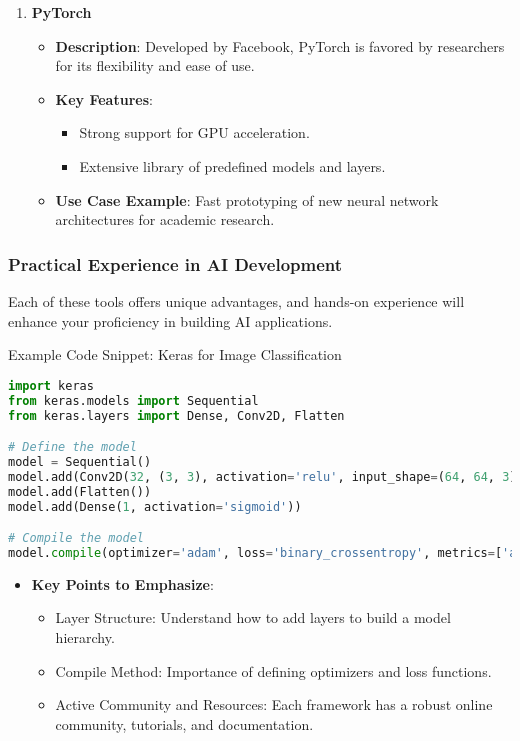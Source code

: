 \documentclass{beamer}
\begin{document}
\begin{frame}[fragile]
\begin{enumerate}
        \item \textbf{PyTorch}
            \begin{itemize}
                \item \textbf{Description}: Developed by Facebook, PyTorch is favored by researchers for its flexibility and ease of use.
                \item \textbf{Key Features}:
                    \begin{itemize}
                        \item Strong support for GPU acceleration.
                        \item Extensive library of predefined models and layers.
                    \end{itemize}
                \item \textbf{Use Case Example}: Fast prototyping of new neural network architectures for academic research.
            \end{itemize}
    \end{enumerate}
\end{frame}

\begin{frame}[fragile]
    \frametitle{Practical Experience in AI Development}
    Each of these tools offers unique advantages, and hands-on experience will enhance your proficiency in building AI applications.

    \begin{block}{Example Code Snippet: Keras for Image Classification}
    \begin{lstlisting}[language=Python]
import keras
from keras.models import Sequential
from keras.layers import Dense, Conv2D, Flatten

# Define the model
model = Sequential()
model.add(Conv2D(32, (3, 3), activation='relu', input_shape=(64, 64, 3)))
model.add(Flatten())
model.add(Dense(1, activation='sigmoid'))

# Compile the model
model.compile(optimizer='adam', loss='binary_crossentropy', metrics=['accuracy'])
    \end{lstlisting}
    \end{block}

    \begin{itemize}
        \item \textbf{Key Points to Emphasize}:
            \begin{itemize}
                \item Layer Structure: Understand how to add layers to build a model hierarchy.
                \item Compile Method: Importance of defining optimizers and loss functions.
                \item Active Community and Resources: Each framework has a robust online community, tutorials, and documentation.
            \end{itemize}
    \end{itemize}
\end{frame}
\end{document}
